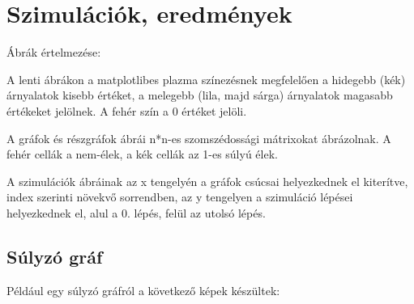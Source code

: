 \chapter{Szimulációk, eredmények}

Ábrák értelmezése:

A lenti ábrákon a matplotlibes plazma színezésnek megfelelően a hidegebb (kék) árnyalatok kisebb
értéket, a melegebb (lila, majd sárga) árnyalatok magasabb értékeket jelölnek. A fehér
szín a 0 értéket jelöli.

A gráfok és részgráfok ábrái n*n-es szomszédossági mátrixokat ábrázolnak. A fehér cellák a nem-élek,
a kék cellák az 1-es súlyú élek.

A szimulációk ábráinak az x tengelyén a gráfok csúcsai helyezkednek el kiterítve, index szerinti
növekvő sorrendben, az y tengelyen a szimuláció lépései helyezkednek el, alul a 0. lépés, felül
az utolsó lépés.

\section{Súlyzó gráf}

Például egy súlyzó gráfról a következő képek készültek:


